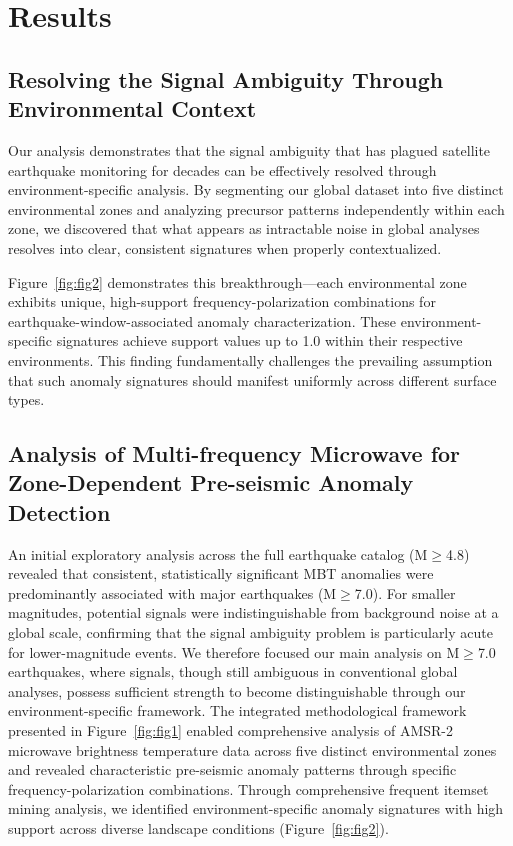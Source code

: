 \documentclass[preprint,review,12pt,authoryear]{elsarticle}
\begin{document}
\section{Results}
\subsection{Resolving the Signal Ambiguity Through Environmental Context}
Our analysis demonstrates that the signal ambiguity that has plagued satellite earthquake monitoring for decades can be effectively resolved through environment-specific analysis. By segmenting our global dataset into five distinct environmental zones and analyzing precursor patterns independently within each zone, we discovered that what appears as intractable noise in global analyses resolves into clear, consistent signatures when properly contextualized.

Figure~\ref{fig:fig2} demonstrates this breakthrough---each environmental zone exhibits unique, high-support frequency-polarization combinations for earthquake-window-associated anomaly characterization. These environment-specific signatures achieve support values up to 1.0 within their respective environments. This finding fundamentally challenges the prevailing assumption that such anomaly signatures should manifest uniformly across different surface types.

\subsection{Analysis of Multi-frequency Microwave for Zone-Dependent Pre-seismic Anomaly Detection}
An initial exploratory analysis across the full earthquake catalog (M$\ge$4.8) revealed that consistent, statistically significant MBT anomalies were predominantly associated with major earthquakes (M$\ge$7.0). For smaller magnitudes, potential signals were indistinguishable from background noise at a global scale, confirming that the signal ambiguity problem is particularly acute for lower-magnitude events. We therefore focused our main analysis on M$\ge$7.0 earthquakes, where signals, though still ambiguous in conventional global analyses, possess sufficient strength to become distinguishable through our environment-specific framework. The integrated methodological framework presented in Figure~\ref{fig:fig1} enabled comprehensive analysis of AMSR-2 microwave brightness temperature data across five distinct environmental zones and revealed characteristic pre-seismic anomaly patterns through specific frequency-polarization combinations. Through comprehensive frequent itemset mining analysis, we identified environment-specific anomaly signatures with high support across diverse landscape conditions (Figure~\ref{fig:fig2}).
\end{document}
